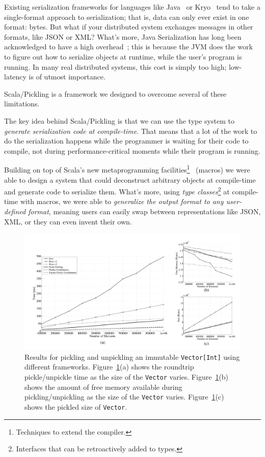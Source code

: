 \documentclass[acmtocl]{acmtrans2m}
\begin{document}
Existing serialization frameworks for languages like
Java~\cite{JavaSerialization} or Kryo~\cite{Kryo} tend to take a single-format
approach to serialization; that is, data can only ever exist in one format:
bytes. But what if your distributed system exchanges messages in other
formats, like JSON or XML? What's more, Java Serialization has long been
acknowledged to have a high overhead~\cite{JavaSlow1, Javaslow2}; this is
because the JVM does the work to figure out how to serialize objects at
runtime, while the user's program is running. In many real distributed
systems, this cost is simply too high; low-latency is of utmost importance.

Scala/Pickling is a framework we designed to overcome several of these
limitations.

The key idea behind Scala/Pickling is that we can use the type system to
\textit{generate serialization code at compile-time}. That means that a lot of
the work to do the serialization happens while the programmer is waiting for
their code to compile, not during performance-critical moments while their
program is running.

Building on top of Scala's new metaprogramming facilities\footnote{Techniques
to extend the compiler.}~\cite{ScalaMacros} (macros) we were able to design a
system that could deconstruct arbitrary objects at compile-time and generate
code to serialize them. What's more, using \textit{type
classes}\footnote{Interfaces that can be retroactively added to types.} at
compile-time with macros, we were able to \textit{generalize the output format
to any user-defined format}, meaning users can easily swap between
representations like JSON, XML, or they can even invent their own.

\begin{figure}[t!]
 \centering
 \includegraphics[width=\textwidth]{travInt-all.pdf}
 \caption{\footnotesize Results for pickling and unpickling an immutable
   \texttt{Vector[Int]} using different frameworks. Figure~\ref{fig:results-vector}(a) shows the roundtrip pickle/unpickle time as the size of the \texttt{Vector} varies. Figure~\ref{fig:results-vector}(b) shows the amount of free memory available during pickling/unpickling as the size of the \texttt{Vector} varies. Figure~\ref{fig:results-vector}(c) shows the pickled size of \texttt{Vector}.}
 \label{fig:results-vector}
\end{figure}
\end{document}
